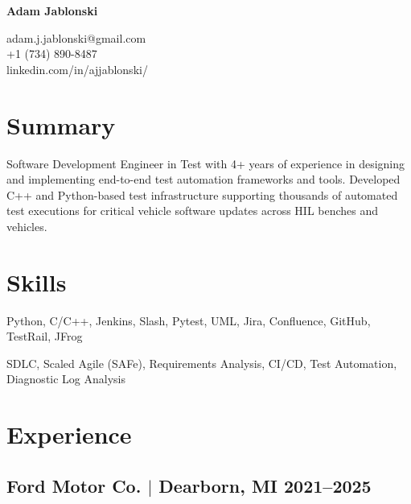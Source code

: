 \documentclass[11pt]{article}
\begin{document}
\pagestyle{empty}

\begin{center}
  \begin{minipage}{0.45\textwidth}
    {\Huge\bfseries
      Adam Jablonski
    }
  \end{minipage} \hfill
  \begin{minipage}{0.5\textwidth}
    \raggedleft
    adam.j.jablonski@gmail.com \\
    +1 (734) 890-8487 \\
    linkedin.com/in/ajjablonski/
  \end{minipage}
\end{center}

\section{Summary}
\noindent 
Software Development Engineer in Test with 4+ years of experience in designing and implementing 
end-to-end test automation frameworks and tools. Developed C++ and Python-based test infrastructure 
supporting thousands of automated test executions for critical vehicle software updates across HIL 
benches and vehicles.

\section{Skills}
\begin{description}[itemsep=0pt]
  \item[Tools] Python, C/C++, Jenkins, Slash, Pytest, UML, Jira, Confluence, GitHub, TestRail, JFrog
  \item[Practices] SDLC, Scaled Agile (SAFe), Requirements Analysis, CI/CD, 
  Test Automation, Diagnostic Log Analysis
\end{description}

\section{Experience}
\subsection{Ford Motor Co. $|$ {\normalfont Dearborn, MI} \hfill 2021--2025}
\end{document}
